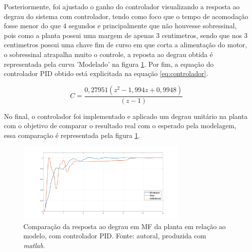 \documentclass{ifacconf}
\begin{document}
Posteriormente, foi ajustado o ganho do controlador visualizando a resposta ao degrau do sistema com controlador, tendo como foco que o tempo de acomodação
fosse menor do que 4 segundos e principalmente que não houvesse sobressinal, pois como a planta possui uma margem de apenas 3 centimetros, sendo que nos 3 centimetros
possui uma chave fim de curso em que corta a alimentação do motor, o sobressinal atrapalha muito o controle, a reposta ao degrau obtida é representada pela curva 'Modelado' na figura \ref{fig:comparacao_mf_controle_step}.
Por fim, a equação do controlador PID obtido está explicitada na equação \ref{eq:controlador}.

\begin{equation}
  C = \frac{0,27951(z^2 - 1,994z + 0,9948)}{(z-1)}
  \label{eq:controlador}
\end{equation}


No final, o controlador foi implementado e aplicado um degrau unitário na planta com o objetivo de comparar o resultado real com o esperado
pela modelagem, essa comparação é representada pela figura \ref{fig:comparacao_mf_controle_step}.

\begin{figure}[!htb]
  \begin{center}
  \includegraphics[width=8.4cm]{figures/comparacao_mf_controle_step.png}    %
  \caption{Comparação da resposta ao degrau em MF da planta em relação ao modelo, com controlador PID. Fonte: autoral, produzida com \textit{matlab}.} 
  \label{fig:comparacao_mf_controle_step}
  \end{center}
\end{figure}
\end{document}
